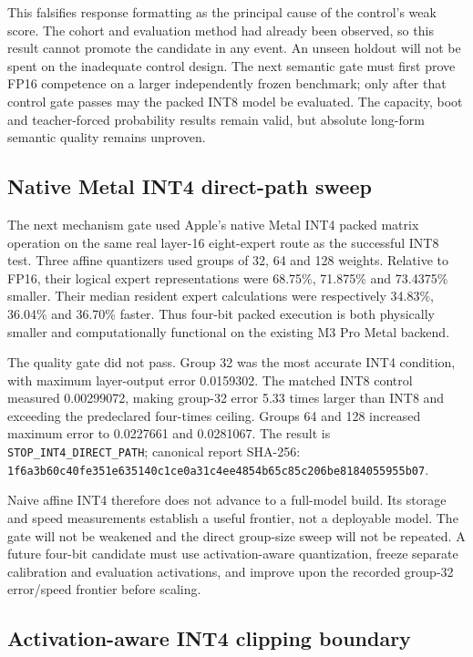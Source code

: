 This falsifies response formatting as the principal cause of the control's weak
score. The cohort and evaluation method had already been observed, so this
result cannot promote the candidate in any event. An unseen holdout will not be
spent on the inadequate control design. The next semantic gate must first prove
FP16 competence on a larger independently frozen benchmark; only after that
control gate passes may the packed INT8 model be evaluated. The capacity, boot
and teacher-forced probability results remain valid, but absolute long-form
semantic quality remains unproven.

\subsection{Native Metal INT4 direct-path sweep}

The next mechanism gate used Apple's native Metal INT4 packed matrix operation
on the same real layer-16 eight-expert route as the successful INT8 test. Three
affine quantizers used groups of 32, 64 and 128 weights. Relative to FP16, their
logical expert representations were 68.75\%, 71.875\% and 73.4375\% smaller.
Their median resident expert calculations were respectively 34.83\%, 36.04\%
and 36.70\% faster. Thus four-bit packed execution is both physically smaller
and computationally functional on the existing M3 Pro Metal backend.

The quality gate did not pass. Group 32 was the most accurate INT4 condition,
with maximum layer-output error 0.0159302. The matched INT8 control measured
0.00299072, making group-32 error 5.33 times larger than INT8 and exceeding the
predeclared four-times ceiling. Groups 64 and 128 increased maximum error to
0.0227661 and 0.0281067. The result is
\texttt{STOP\_INT4\_DIRECT\_PATH}; canonical report SHA-256:
\texttt{1f6a3b60c40fe351e635140c1ce0a31c4ee4854b65c85c206be8184055955b07}.

Naive affine INT4 therefore does not advance to a full-model build. Its storage
and speed measurements establish a useful frontier, not a deployable model.
The gate will not be weakened and the direct group-size sweep will not be
repeated. A future four-bit candidate must use activation-aware quantization,
freeze separate calibration and evaluation activations, and improve upon the
recorded group-32 error/speed frontier before scaling.

\subsection{Activation-aware INT4 clipping boundary}

